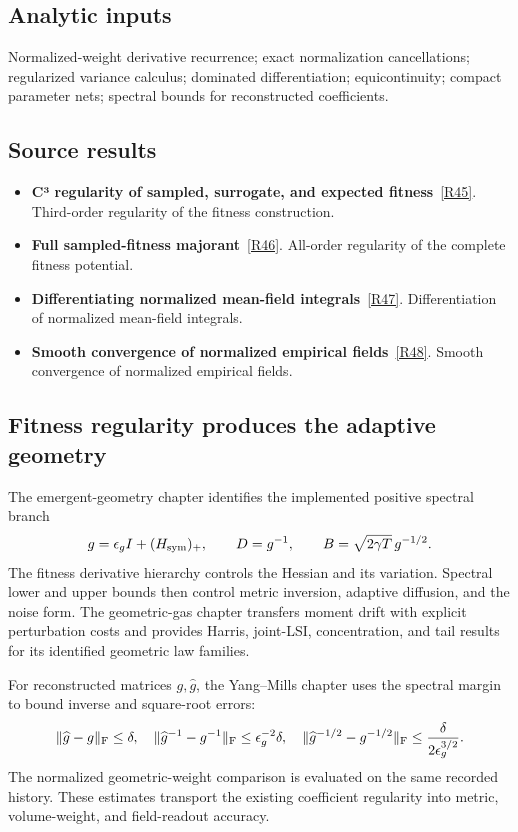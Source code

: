 \documentclass[11pt,a4paper]{article}
\begin{document}
\subsection*{Analytic inputs}
Normalized-weight derivative recurrence; exact normalization cancellations; regularized variance calculus; dominated differentiation; equicontinuity; compact parameter nets; spectral bounds for reconstructed coefficients.
\subsection*{Source results}
\begin{itemize}
\item \textbf{C³ regularity of sampled, surrogate, and expected fitness}~\hyperref[src:thm-c3-regularity]{[R45]}. Third-order regularity of the fitness construction.
\item \textbf{Full sampled-fitness majorant}~\hyperref[src:thm-main-cinf-regularity-fitness-potential-full]{[R46]}. All-order regularity of the complete fitness potential.
\item \textbf{Differentiating normalized mean-field integrals}~\hyperref[src:thm-cinf-mean-field-integrals]{[R47]}. Differentiation of normalized mean-field integrals.
\item \textbf{Smooth convergence of normalized empirical fields}~\hyperref[src:thm-cinf-empirical-field-convergence]{[R48]}. Smooth convergence of normalized empirical fields.
\end{itemize}
\subsection*{Fitness regularity produces the adaptive geometry}
The emergent-geometry chapter identifies the implemented positive spectral branch
\[
g=\epsilon_g I+(H_{\rm sym})_+,
\qquad D=g^{-1},
\qquad B=\sqrt{2\gamma T}\,g^{-1/2}.
\]
The fitness derivative hierarchy controls the Hessian and its variation. Spectral lower and upper bounds then control metric inversion, adaptive diffusion, and the noise form. The geometric-gas chapter transfers moment drift with explicit perturbation costs and provides Harris, joint-LSI, concentration, and tail results for its identified geometric law families.

For reconstructed matrices \(g,\widehat g\), the Yang--Mills chapter uses the spectral margin to bound inverse and square-root errors:
\[
\|\widehat g-g\|_{\rm F}\le\delta,
\quad \|\widehat g^{-1}-g^{-1}\|_{\rm F}\le\epsilon_g^{-2}\delta,
\quad
\|\widehat g^{-1/2}-g^{-1/2}\|_{\rm F}
\le\frac{\delta}{2\epsilon_g^{3/2}}.
\]
The normalized geometric-weight comparison is evaluated on the same recorded history. These estimates transport the existing coefficient regularity into metric, volume-weight, and field-readout accuracy.
\end{document}
